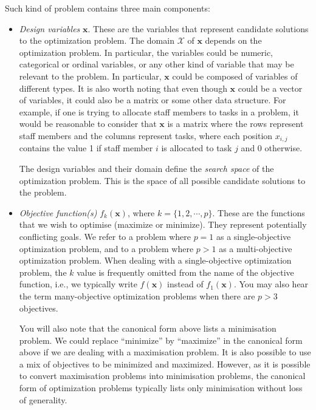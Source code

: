 Such kind of problem contains three main components:
\begin{itemize}
\item \textit{Design variables} $\mathbf{x}$. These are the variables that represent candidate solutions to the optimization problem. The domain $\mathcal{X}$ of $\mathbf{x}$ depends on the optimization problem. In particular, the variables could be numeric, categorical or ordinal variables, or any other kind of variable that may be relevant to the problem. In particular, $\mathbf{x}$ could be composed of variables of different types. It is also worth noting that even though $\mathbf{x}$ could be a vector of variables, it could also be a matrix or some other data structure. For example, if one is trying to allocate staff members to tasks in a problem, it would be reasonable to consider that $\mathbf{x}$ is a matrix where the rows represent staff members and the columns represent tasks, where each position $x_{i,j}$ contains the value 1 if staff member $i$ is allocated to task $j$ and 0 otherwise. 

The design variables and their domain define the \textit{search space} of the optimization problem. This is the space of all possible candidate solutions to the problem.

\item \textit{Objective function(s)} $f_k(\mathbf{x})$, where $k=\{1,2,\cdots,p\}$. These are the functions that we wish to optimise (maximize or minimize). They represent potentially conflicting goals. We refer to a problem where $p=1$ as a single-objective optimization problem, and to a problem where $p>1$ as a multi-objective optimization problem. When dealing with a single-objective optimization problem, the $k$ value is frequently omitted from the name of the objective function, i.e., we typically write $f(\mathbf{x})$ instead of $f_1(\mathbf{x})$. You may also hear the term many-objective optimization problems when there are $p>3$ objectives. 

You will also note that the canonical form above lists a minimisation problem. We could replace ``minimize'' by ``maximize'' in the canonical form above if we are dealing with a maximisation problem. It is also possible to use a mix of objectives to be minimized and maximized. However, as it is possible to convert maximisation problems into minimisation problems, the canonical form of optimization problems typically lists only minimisation without loss of generality. 


\end{itemize}

